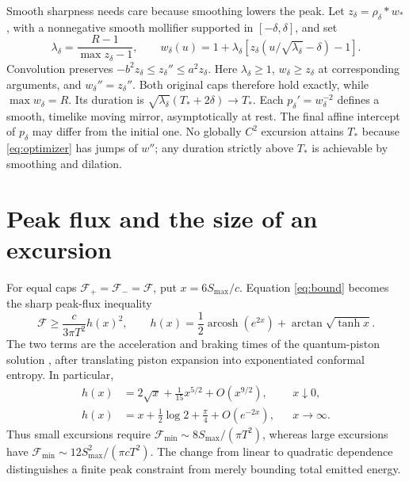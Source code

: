 \documentclass[10pt]{article}
\newcommand{\arcosh}{\operatorname{arcosh}}
\begin{document}
Smooth sharpness needs care because smoothing lowers the peak. Let
$z_\delta=\rho_\delta*w_*$, with a nonnegative smooth mollifier supported
in $[-\delta,\delta]$, and set
\begin{equation}
 \lambda_\delta=\frac{R-1}{\max z_\delta-1},\qquad
 w_\delta(u)=1+\lambda_\delta
 \left[z_\delta\left(u/\sqrt{\lambda_\delta}-\delta\right)-1\right].
 \label{eq:smooth}
\end{equation}
Convolution preserves $-b^2z_\delta\le z_\delta''\le a^2z_\delta$.
Here $\lambda_\delta\ge1$, $w_\delta\ge z_\delta$ at corresponding
arguments, and $w_\delta''=z_\delta''$. Both original caps therefore hold
exactly, while $\max w_\delta=R$. Its duration is
$\sqrt{\lambda_\delta}(T_*+2\delta)\to T_*$. Each $p_\delta'=w_\delta^{-2}$
defines a smooth, timelike moving mirror, asymptotically at rest. The final
affine intercept of $p_\delta$ may differ from the initial one. No globally
$C^2$ excursion attains $T_*$ because \eqref{eq:optimizer} has jumps of $w''$;
any duration strictly above $T_*$ is achievable by smoothing and dilation.

\section{Peak flux and the size of an excursion}

For equal caps $\mathcal F_+=\mathcal F_-=\mathcal F$, put $x=6S_{\max}/c$.
Equation \eqref{eq:bound} becomes the sharp peak-flux inequality
\begin{equation}
 \boxed{\ \mathcal F\ge\frac{c}{3\pi T^2}h(x)^2,\qquad
 h(x)=\frac12\arcosh(e^{2x})+\arctan\sqrt{\tanh x}.\ }
 \label{eq:peak}
\end{equation}
The two terms are the acceleration and braking times of the quantum-piston
solution \cite{Stefanatos}, after translating piston expansion into
exponentiated conformal entropy. In particular,
\begin{align}
 h(x)&=2\sqrt{x}+\tfrac1{15}x^{5/2}+O(x^{9/2}),&&x\downarrow0,\\
 h(x)&=x+\tfrac12\log2+\tfrac\pi4+O(e^{-2x}),&&x\to\infty.
\end{align}
Thus small excursions require
$\mathcal F_{\min}\sim8S_{\max}/(\pi T^2)$, whereas large excursions have
$\mathcal F_{\min}\sim12S_{\max}^2/(\pi cT^2)$.
The change from linear to quadratic dependence distinguishes a finite peak
constraint from merely bounding total emitted energy.
\end{document}
